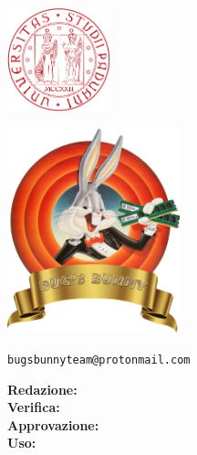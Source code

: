 \begin{titlepage}
    \makeatletter
    
    \begin{minipage}[]{0.3\textwidth}
       	\includegraphics[width=3cm]{assets/unipd}
   	\end{minipage}
    \begin{minipage}[]{0.7\textwidth}
    \end{minipage}
    \begin{center}
        
        \includegraphics[width=5cm]{assets/logo}
        
        \Huge
        \textbf{\teamname}
        
        \vspace{3cm}
        
        \textbf{\@title}

		\vspace{1cm}
		
		\small
		\texttt{bugsbunnyteam@protonmail.com}

        \vspace{1.5cm}
        \Large
        
        \textbf{Redazione:} \@author \\
        \textbf{Verifica:} \@verificatore \\
        \textbf{Approvazione:} \@approvatore \\
        \textbf{Uso:} \@uso \\
        
        \vfill
        \makeatother
    \end{center}
\end{titlepage}
